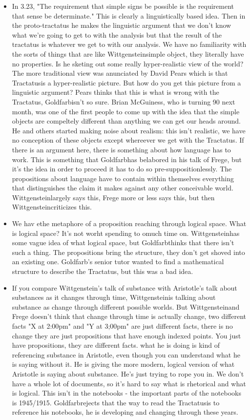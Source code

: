 \documentclass[12pt]{article}
\theoremstyle{definition}
\newcommand{\w}{Wittgenstein}
\newcommand{\T}{Tractatus}
\newcommand{\g}{Goldfarb}
\begin{document}
\begin{itemize}
    \item In 3.23, "The requirement that simple signs be possible is the requirement that sense be determinate." This is clearly a linguistically based idea. Then in the proto-tractatus he makes the linguistic argument that we don't know what we're going to get to with the analysis but that the result of the tractatus is whatever we get to with our analysis. We have no familiarity with the sorts of things that are like \w simple object, they literally have no properties. Is he sketing out some really hyper-realistic view of the world? The more traditional view was anunciated by David Pears which is that \T is a hyper-realistic picture. But how do you get this picture from a linguistic argument? Pears thinks that this is what is wrong with the \T, \g isn't so sure. Brian McGuiness, who is turning 90 next month, was one of the first people to come up with the idea that the simple objects are compeltely different than anything we can get our heads around. He and others started making noise about realism: this isn't realistic, we have no conception of these objects except whereever we get with the Tractatus. If there is an argument here, there is something about how language has to work. This is something that \g has belabored in his talk of Frege, but it's the idea in order to proceed it has to do so pre-suppositionlessly. The propositions about language have to contain within themselves everything that distinguishes the claim it makes against any other conceivable world. \w largely says this, Frege more or less says this, but then \w criticizes this.
    \item We hav ethe metaphore of a proposition reaching through logical space. What is logical space? It's not worht spending to omuch time on. \w has some vague idea of what logical space, but \g thinks that there isn't such a thing. The propositions bring the structure, they don't get shoved into an existing one. \g 's senior tutor wanted to find a mathematical structure to describe the \T, but this was a bad idea.
    \item If you compare \w 's talk of substance with Aristotle's talk about substances as it changes through time, \w is talking about substance as change through different possible worlds. But \w and Frege doesn't think that change through time is actually change, two different facts "X at 2:00pm" and "Y at 3;00pm" are just different facts, there is no change they are just propositions that have enough indexed points. You just have propositions, they are different facts. what he is doing is kind of referencing substance in Aristotle, even though you can understand what he is saying without it. He is giving the more modern, logical version of what Aristotle is saying about substance. He's just trying to rope you in. We don't have a whole lot of documents, so it's hard to say what is rhetorical and what is logical. This isn't in the notebooks - the important parts of the notebooks is 1945/1915. \g rejects that the way to read the \T is to reference his notebooks, he is developing and changing through these years.

\end{itemize}
\end{document}
